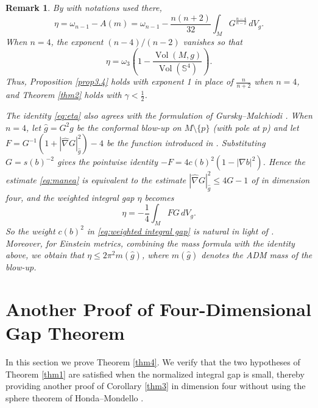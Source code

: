 \documentclass[11pt]{amsart}
\theoremstyle{plain}
\newtheorem{remark}[theorem]{Remark}
\numberwithin{equation}{section}
\renewcommand{\S}{\mathbb{S}}
\newcommand{\wh}[1]{\widehat{#1}}
\DeclareMathOperator{\vol}{Vol}
\newcommand{\hn}{\widehat{\nabla}}
\newcommand{\hg}{\widehat{g}}
\newcommand{\dvol}{\,dV_g}
\begin{document}
\begin{remark}\label{rmk3.5}
By \cite[Proposition 6.1]{Man25} with notations used there, 
\begin{equation*}
\eta=\omega_{n-1}-A(m)=\omega_{n-1}-\frac{n(n+2)}{32}\int_{M}G^{\frac{n-4}{n-2}}\dvol.
\end{equation*}
When $n=4$, the exponent $(n-4)/(n-2)$ vanishes so that
\begin{equation}\label{eq:eta}
\eta=\omega_3\left(1-\frac{\vol(M,g)}{\vol(\S^4)}\right).
\end{equation}
Thus, Proposition \ref{prop3.4} holds with exponent 1 in place of $\frac{n}{n+2}$ when $n=4$, and Theorem \ref{thm2} holds with $\gamma<\frac{1}{2}$.

The identity \eqref{eq:eta} also agrees with the formulation of Gursky--Malchiodi \cite{GurskyMalchiodi}. When $n=4$, let $\wh{g}=G^2g$ be the conformal blow-up on $M\setminus\{p\}$ (with pole at $p$) and let $F=G^{-1}(1+|\hn G|_{\hg}^2)-4$ be the function introduced in \cite[(3.1)]{GurskyMalchiodi}. Substituting $G=s(b)^{-2}$ gives the pointwise identity $-F=4c(b)^2(1-|\nabla b|^2)$. Hence the estimate \eqref{eq:manea} is equivalent to the estimate $|\hn G|_{\hg}^2\le 4G-1$ of \cite[Proposition 3.3]{GurskyMalchiodi} in dimension four, and the weighted integral gap $\eta$ becomes 
\begin{equation*}
\eta=-\frac{1}{4}\int_M FG\dvol.
\end{equation*}
So the weight $c(b)^2$ in \eqref{eq:weighted integral gap} is natural in light of \cite{GurskyMalchiodi}. Moreover, for Einstein metrics, combining the mass formula \cite[Theorem 1.1]{GurskyMalchiodi} with the identity above, we obtain that $\eta\le 2\pi^2 m(\hg)$, where $m(\hg)$ denotes the ADM mass of the blow-up.
\end{remark}

\section{Another Proof of Four-Dimensional Gap Theorem}
In this section we prove Theorem \ref{thm4}. We verify that the two hypotheses of Theorem \ref{thm1} are satisfied when the normalized integral gap is small, thereby providing another proof of Corollary \ref{thm3} in dimension four without using the sphere theorem of Honda--Mondello \cite{HondaMondello}.
\end{document}
